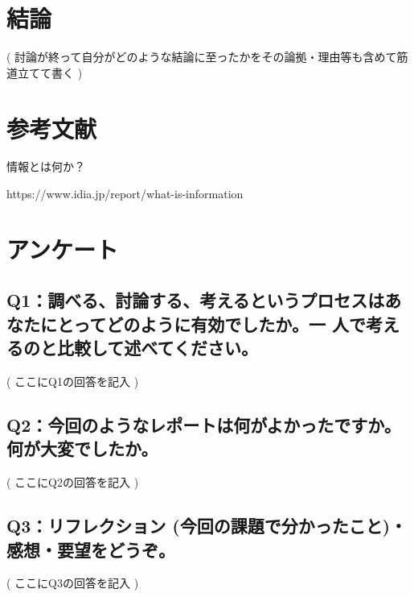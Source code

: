 \documentclass[12pt,a4j]{jarticle}
\begin{document}
\section{結論}
( 討論が終って自分がどのような結論に至ったかをその論拠・理由等も含めて筋道立てて書く )

\section{参考文献}

情報とは何か？

https://www.idia.jp/report/what-is-information

\section{アンケート}

\subsection{Q1：調べる、討論する、考えるというプロセスはあなたにとってどのように有効でしたか。一 人で考えるのと比較して述べてください。}
( ここにQ1の回答を記入 )

\subsection{Q2：今回のようなレポートは何がよかったですか。何が大変でしたか。}
( ここにQ2の回答を記入 )

\subsection{Q3：リフレクション (今回の課題で分かったこと)・感想・要望をどうぞ。}
( ここにQ3の回答を記入 )
\end{document}
